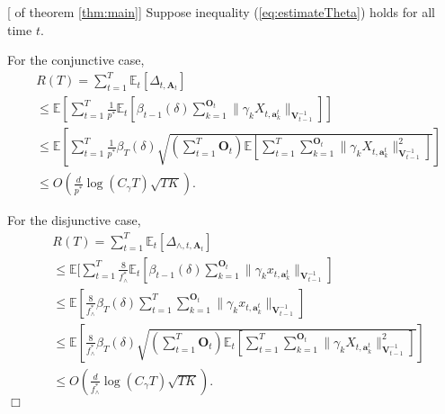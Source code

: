 \documentclass{article}
\newcommand{\EE}{\mathbb{E}}
\newcommand{\bA}{\mathbf{A}}
\newcommand{\ba}{\mathbf{a}}
\newcommand{\bO}{\mathbf{O}}
\newcommand{\bV}{\mathbf{V}}
\newcommand{\norm}[1]{\| #1 \|}
\newenvironment{proof}{\noindent {\textbf{Proof. }}}{$\Box$ \medskip}
\begin{document}
\begin{proof}[ of theorem \ref{thm:main}]
Suppose inequality (\ref{eq:estimateTheta}) holds for all time $t$. 

For the conjunctive case,
\begin{equation}
\begin{split}
&R(T) =\sum_{t=1}^{T} \EE_{t}[\Delta_{t, \bA_t}] \\
&\leq \EE[\sum_{t=1}^{T} \frac{1}{p^*} \EE_t[\beta_{t-1}(\delta) \sum_{k=1}^{\bO_t}\norm{\gamma_k X_{t,\ba_k^t}}_{\bV_{t-1}^{-1}}]]\\
&\leq \EE[\sum_{t=1}^{T} \frac{1}{p^*} \beta_T(\delta) \sqrt{(\sum_{t=1}^{T} \bO_t) \EE[\sum_{t=1}^{T} \sum_{k=1}^{\bO_t}\norm{\gamma_k X_{t,\ba_k^t}}_{\bV_{t-1}^{-1}}^2]} ]  \\
&\leq O(\frac{d}{p^*} \log(C_\gamma T)\sqrt{TK}).
\end{split}
\end{equation}

For the disjunctive case, 
\begin{equation}
\begin{split}
&R(T) =\sum_{t=1}^{T} \EE_{t}[\Delta_{\wedge, t, \bA_t}] \\
&\leq \EE[\sum_{t=1}^{T} \frac{8}{f_{\wedge}^{\ast}} \EE_t[\beta_{t-1}(\delta)\sum_{k=1}^{\bO_t}\norm{\gamma_k x_{t,\ba_k^t}}_{\bV_{t-1}^{-1}}] \\
&\leq \EE[\frac{8}{f_{\wedge}^{\ast}} \beta_{T}(\delta) \sum_{t=1}^{T} \sum_{k=1}^{\bO_t}\norm{\gamma_k x_{t,\ba_k^t}}_{\bV_{t-1}^{-1}}]\\
&\leq \EE[\frac{8}{f_{\wedge}^{\ast}} \beta_{T}(\delta) \sqrt{(\sum_{t=1}^{T} \bO_t) \EE_t[\sum_{t=1}^{T} \sum_{k=1}^{\bO_t}\norm{\gamma_k X_{t,\ba_k^t}}_{\bV_{t-1}^{-1}}^2]}]\\
&\leq O(\frac{d}{f_{\wedge}^{\ast}}\log(C_\gamma T)\sqrt{TK}).
\end{split}
\end{equation}
\end{proof}
	
	
	


	
\end{document}
